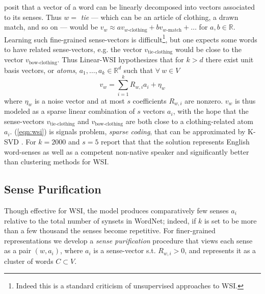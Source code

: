 \documentclass{book}
\begin{document}
\cite{polysemy} posit that a vector of a word can be linearly decomposed into vectors associated to its senses.
Thus $w=$ {\em tie} --- which can be an article of clothing, a drawn match, and so on --- would be $v_w\approx av_{w\textrm{-clothing}}+bv_{w\textrm{-match}}+\dots$ for $a,b\in\mathbb{R}$.
Learning such fine-grained sense-vectors is difficult\footnote{Indeed this is a standard criticism of unsupervised approaches to WSI.}, but one expects some words to have related sense-vectors, e.g. the vector $v_{\textrm{tie-clothing}}$ would be close to the vector $v_{\textrm{bow-clothing}}$.
Thus Linear-WSI hypothesizes that for $k>d$ there exist unit basis vectors, or {\em atoms}, $a_1,\dots,a_k\in\mathbb{R}^d$ such that $\forall~w\in V$
\begin{equation}
\label{eqn:wsi}
v_w=\sum\limits_{i=1}^kR_{w,i}a_i+\eta_w
\end{equation}
where $\eta_w$ is a noise vector and at most $s$ coefficients $R_{w,i}$ are nonzero.
$v_w$ is thus modeled as a sparse linear combination of $s$ vectors $a_i$, with the hope that the sense-vectors $v_{\textrm{tie-clothing}}$ and $v_{\textrm{bow-clothing}}$ are both close to a clothing-related atom $a_i$.
(\ref{eqn:wsi}) is signals problem, {\em sparse coding}, that can be approximated by K-SVD \citep{Aharon:06}.
For $k=2000$ and $s=5$ \cite{polysemy} report that that the solution represents English word-senses as well as a competent non-native speaker and significantly better than clustering methods for WSI.

\subsection{Sense Purification}
\label{subsec:purification}

Though effective for WSI, the model produces comparatively few senses $a_i$ relative to the total number of synsets in WordNet;
indeed, if $k$ is set to be more than a few thousand the senses become repetitive.
For finer-grained representations we develop a {\em sense purification} procedure that views each sense as a pair $(w,a_i)$, where $a_i$ is a sense-vector s.t. $R_{w,i}>0$, and represents it as a cluster of words $C\subset V$.
\end{document}
